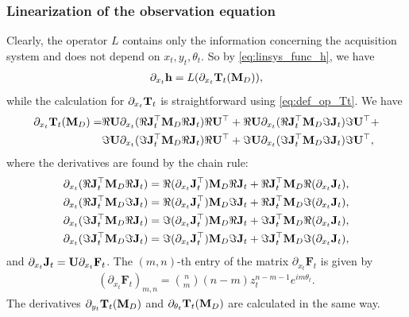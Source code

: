 \subsubsection{Linearization of the observation equation}
\label{sec:lin_obs_eq}

Clearly, the operator $L$ contains only the information
concerning the acquisition system and does not depend on $x_t,
y_t, \theta_t$. So by \eqref{eq:linsys_func_h}, we have
\begin{align}
  \label{eq:partial_h}
  \partial_{x_t}\mathbf{h}=L(\partial_{x_t}\mathbf{T}_t(\mathbf{M}_D)),
\end{align}
while the calculation for $\partial_{x_t}\mathbf{T}_t$ is straightforward using
\eqref{eq:def_op_Tt}. We have %
\begin{align}
  \label{eq:derivatives_Tt}
  \partial_{x_t}\mathbf{T}_t(\mathbf{M}_D) = &\Re \mathbf{U} \partial_{x_t}(\Re \mathbf{J}_t^\top \mathbf{M}_D \Re \mathbf{J}_t) \Re \mathbf{U}^\top +
  \Re \mathbf{U} \partial_{x_t}(\Re \mathbf{J}_t^\top \mathbf{M}_D \Im \mathbf{J}_t) \Im \mathbf{U}^\top + \notag \\
  &\Im \mathbf{U} \partial_{x_t}(\Im \mathbf{J}_t^\top \mathbf{M}_D \Re \mathbf{J}_t) \Re \mathbf{U}^\top + \Im \mathbf{U} \partial_{x_t}(\Im
  \mathbf{J}_t^\top \mathbf{M}_D \Im \mathbf{J}_t) \Im \mathbf{U}^\top ,
\end{align}
where the derivatives are found by the chain rule:
\begin{align*}
\partial_{x_t}(\Re \mathbf{J}_t^\top \mathbf{M}_D \Re \mathbf{J}_t) &= \Re (\partial_{x_t}\mathbf{J}_t^\top) \mathbf{M}_D \Re
\mathbf{J}_t+\Re\mathbf{J}_t^\top \mathbf{M}_D \Re(\partial_{x_t}\mathbf{J}_t),\\
\partial_{x_t}(\Re \mathbf{J}_t^\top \mathbf{M}_D \Im \mathbf{J}_t) &= \Re (\partial_{x_t}\mathbf{J}_t^\top) \mathbf{M}_D
\Im \mathbf{J}_t+\Re\mathbf{J}_t^\top \mathbf{M}_D \Im(\partial_{x_t}\mathbf{J}_t),\\
\partial_{x_t}(\Im \mathbf{J}_t^\top \mathbf{M}_D \Re \mathbf{J}_t) &= \Im (\partial_{x_t}\mathbf{J}_t^\top)
\mathbf{M}_D \Re \mathbf{J}_t+\Im\mathbf{J}_t^\top \mathbf{M}_D \Re(\partial_{x_t}\mathbf{J}_t),\\
\partial_{x_t}(\Im \mathbf{J}_t^\top \mathbf{M}_D \Im \mathbf{J}_t) &= \Im (\partial_{x_t}\mathbf{J}_t^\top)
 \mathbf{M}_D \Im \mathbf{J}_t+\Im\mathbf{J}_t^\top \mathbf{M}_D \Im(\partial_{x_t}\mathbf{J}_t),
\end{align*}
and $\partial_{x_t}\mathbf{J}_t = \mathbf{U}\partial_{x_t} \mathbf{F}_t$. The
$(m,n)$-th entry of the matrix $\partial_{x_t} \mathbf{F}_t$ is
given by
\begin{align}
  \label{derv_z_Ft}
  (\partial_{x_t} \mathbf{F}_t)_{m,n} = \binom{n}{m} (n-m) z_t^{n-m-1}
  e^{im\theta_t}.
\end{align}
The derivatives $ \partial_{y_t}\mathbf{T}_t(\mathbf{M}_D)$ and $\partial_{\theta_t}\mathbf{T}_t(\mathbf{M}_D)$ are calculated
in the same way.

